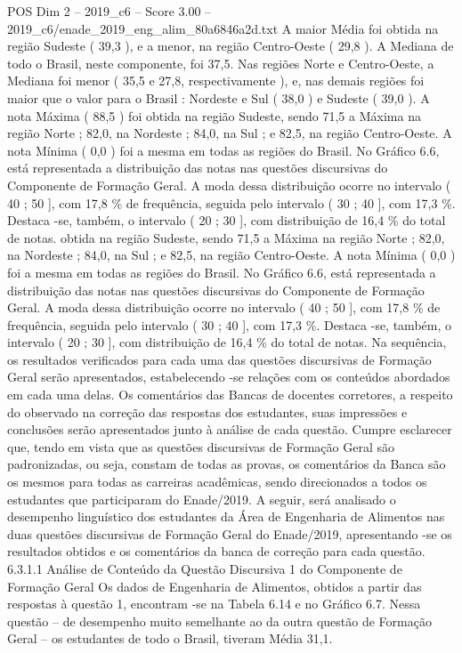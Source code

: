 \begin{textsample}{POS Dim 2 – 2019\_c6 – Score 3.00 – 2019\_c6/enade\_2019\_eng\_alim\_80a6846a2d.txt}
A maior Média foi obtida na região Sudeste ( 39,3 ), e a menor, na região Centro-Oeste ( 29,8 ).
A Mediana de todo o Brasil, neste componente, foi 37,5.
Nas regiões Norte e Centro-Oeste, a Mediana foi menor ( 35,5 e 27,8, respectivamente ), e, nas demais regiões foi maior que o valor para o Brasil : Nordeste e Sul ( 38,0 ) e Sudeste ( 39,0 ).
A nota Máxima ( 88,5 ) foi obtida na região Sudeste, sendo 71,5 a Máxima na região Norte ; 82,0, na Nordeste ; 84,0, na Sul ; e 82,5, na região Centro-Oeste.
A nota Mínima ( 0,0 ) foi a mesma em todas as regiões do Brasil.
No Gráfico 6.6, está representada a distribuição das notas nas questões discursivas do Componente de Formação Geral.
A moda dessa distribuição ocorre no intervalo ( 40 ; 50 ], com 17,8 \% de frequência, seguida pelo intervalo ( 30 ; 40 ], com 17,3 \%.
Destaca -se, também, o intervalo ( 20 ; 30 ], com distribuição de 16,4 \% do total de notas. obtida na região Sudeste, sendo 71,5 a Máxima na região Norte ; 82,0, na Nordeste ; 84,0, na Sul ; e 82,5, na região Centro-Oeste.
A nota Mínima ( 0,0 ) foi a mesma em todas as regiões do Brasil.
No Gráfico 6.6, está representada a distribuição das notas nas questões discursivas do Componente de Formação Geral.
A moda dessa distribuição ocorre no intervalo ( 40 ; 50 ], com 17,8 \% de frequência, seguida pelo intervalo ( 30 ; 40 ], com 17,3 \%.
Destaca -se, também, o intervalo ( 20 ; 30 ], com distribuição de 16,4 \% do total de notas.
Na sequência, os resultados verificados para cada uma das questões discursivas de Formação Geral serão apresentados, estabelecendo -se relações com os conteúdos abordados em cada uma delas.
Os comentários das Bancas de docentes corretores, a respeito do observado na correção das respostas dos estudantes, suas impressões e conclusões serão apresentados junto à análise de cada questão.
Cumpre esclarecer que, tendo em vista que as questões discursivas de Formação Geral são padronizadas, ou seja, constam de todas as provas, os comentários da Banca são os mesmos para todas as carreiras acadêmicas, sendo direcionados a todos os estudantes que participaram do Enade/2019.
A seguir, será analisado o desempenho linguístico dos estudantes da Área de Engenharia de Alimentos nas duas questões discursivas de Formação Geral do Enade/2019, apresentando -se os resultados obtidos e os comentários da banca de correção para cada questão. 6.3.1.1 Análise de Conteúdo da Questão Discursiva 1 do Componente de Formação Geral Os dados de Engenharia de Alimentos, obtidos a partir das respostas à questão 1, encontram -se na Tabela 6.14 e no Gráfico 6.7.
Nessa questão – de desempenho muito semelhante ao da outra questão de Formação Geral – os estudantes de todo o Brasil, tiveram Média 31,1.

\end{textsample}
